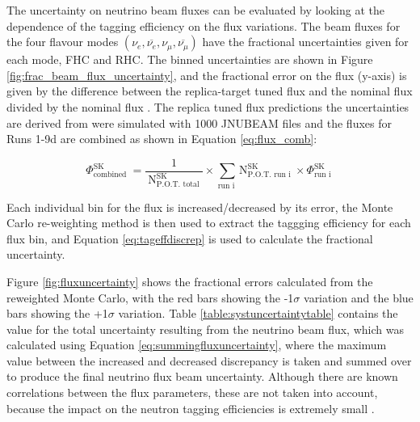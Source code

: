The uncertainty on neutrino beam fluxes can be evaluated by looking at the dependence of the tagging efficiency on the flux variations. The beam fluxes for the four flavour modes 
$\left(\nu_{e}, \overline{\nu_{e}}, \nu_{\mu}, \overline{\nu_{\mu}}\right)$ have the fractional uncertainties given for each mode, FHC and RHC. The binned uncertainties are shown in Figure \ref{fig:frac_beam_flux_uncertainty}, and the fractional error on the flux (y-axis) is given by the difference between the replica-target tuned flux and the nominal flux divided by the nominal flux \cite{vladisavljevic_constraining_2018}. The replica tuned flux predictions the uncertainties are derived from were simulated with 1000 JNUBEAM files and the fluxes for Runs 1-9d are combined as shown in Equation \ref{eq:flux_comb}:

\begin{equation}
    \Phi_{\text {combined }}^{\mathrm{SK}}=\frac{1}{\mathrm{~N}_{\text {P.O.T. total }}^{\text {SK }}} \times \sum_{\text {run i }} \mathrm{N}_{\text {P.O.T. run i }}^{\mathrm{SK}} \times \Phi_{\text {run i }}^{\mathrm{SK}}
\label{eq:flux_comb}
\end{equation}

Each individual bin for the flux is increased/decreased by its error, the Monte Carlo re-weighting method is then used to extract the taggging efficiency for each flux bin, and Equation \ref{eq:tageffdiscrep} is used to calculate the fractional uncertainty.



Figure \ref{fig:fluxuncertainty} shows the fractional errors calculated from the reweighted Monte Carlo, with the red bars showing the -1$\sigma$ variation and the blue bars showing the +1$\sigma$ variation. Table \ref{table:systuncertaintytable} contains the value for the total uncertainty resulting from the neutrino beam flux, which was calculated using Equation \ref{eq:summingfluxuncertainty}, where the maximum value between the increased and decreased discrepancy is taken and summed over to produce the final neutrino flux beam uncertainty.
Although there are known correlations between the flux parameters, these are not taken into account, because the impact on the neutron tagging efficiencies is extremely small \cite{akutsu_thesis}.
\newline

